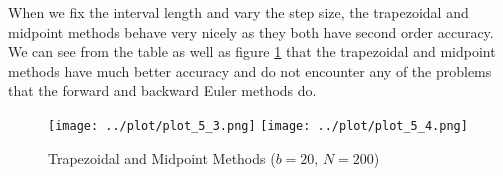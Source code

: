 \begin{solution}
  When we fix the interval length and vary the step size, the trapezoidal and midpoint methods behave very nicely as they both have second order accuracy. We can see from the table as well as figure \ref{fig:mt} that the trapezoidal and midpoint methods have much better accuracy and do not encounter any of the problems that the forward and backward Euler methods do.
  
  \begin{figure}[!ht]
    \centering
    \texttt{[image: ../plot/plot\_5\_3.png]}
    \texttt{[image: ../plot/plot\_5\_4.png]}
    \caption{Trapezoidal and Midpoint Methods ($b=20$, $N=200$)}
    \label{fig:mt}
  \end{figure}
  
\end{solution}